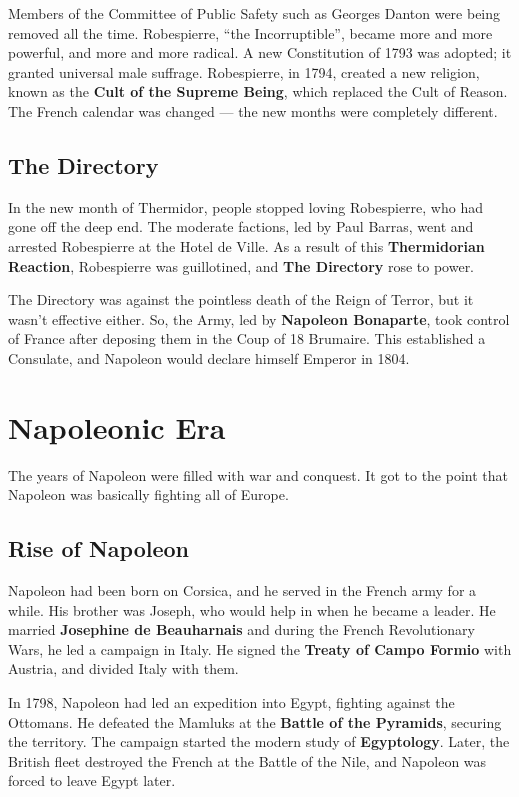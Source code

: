Members of the Committee of Public Safety such as Georges Danton were being removed all the time.
Robespierre, ``the Incorruptible'', became more and more powerful, and more and more radical.
A new Constitution of 1793 was adopted; it granted universal male suffrage.
Robespierre, in 1794, created a new religion, known as the \textbf{Cult of the Supreme Being},
which replaced the Cult of Reason.
The French calendar was changed --- the new months were completely different.

\subsection*{The Directory}

In the new month of Thermidor, people stopped loving Robespierre, who had gone off the deep end.
The moderate factions, led by Paul Barras, went and arrested Robespierre at the Hotel de Ville.
As a result of this \textbf{Thermidorian Reaction}, Robespierre was guillotined,
and \textbf{The Directory} rose to power.

The Directory was against the pointless death of the Reign of Terror, but it wasn't effective either.
So, the Army, led by \textbf{Napoleon Bonaparte},
took control of France after deposing them in the Coup of 18 Brumaire.
This established a Consulate, and Napoleon would declare himself Emperor in 1804.

\section{Napoleonic Era}

The years of Napoleon were filled with war and conquest.
It got to the point that Napoleon was basically fighting all of Europe.

\subsection*{Rise of Napoleon}

Napoleon had been born on Corsica, and he served in the French army for a while.
His brother was Joseph, who would help in when he became a leader.
He married \textbf{Josephine de Beauharnais} and during the French Revolutionary Wars,
he led a campaign in Italy.
He signed the \textbf{Treaty of Campo Formio} with Austria, and divided Italy with them.

In 1798, Napoleon had led an expedition into Egypt, fighting against the Ottomans.
He defeated the Mamluks at the \textbf{Battle of the Pyramids}, securing the territory.
The campaign started the modern study of \textbf{Egyptology}.
Later, the British fleet destroyed the French at the Battle of the Nile,
and Napoleon was forced to leave Egypt later.

